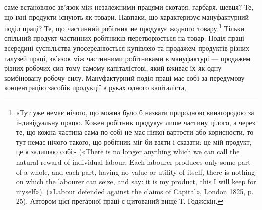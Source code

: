 саме встановлює зв’язок між незалежними працями скотаря,
гарбаря, шевця? Те, що їхні продукти існують як товари. Навпаки,
що характеризує мануфактурний поділ праці? Те, що
частинний робітник не продукує жодного товару.\footnote{
«Тут уже немає нічого, що можна було б назвати природною винагородою
за індивідуальну працю. Кожен робітник продукує лише чаcтину
цілого, а через те, що кожна частина сама по собі не має ніякої
вартости або корисности, то тут немає нічого такого, що робітник міг би
взяти і сказати: це мій продукт, це я залишаю собі» («There is no longer
anything which we can call the natural reward of individual labour.
Each labourer produces only some part of a whole, and each part, having no
value or utility of itself, there is nothing on which the labourer can seize,
and say: it is my product, this I will keep for myself»). («Labour defended
against the claims of Capital», London 1825, p. 25). Автором цієї
прегарної праці є цитований вище Т. Годжскін.
} Тільки спільний
продукт частинних робітників перетворюється на товар. Поділ праці всередині суспільства упосереднюється купівлею та
продажем продуктів різних галузей праці, зв’язок між частинними
робітниками в мануфактурі — продажем різних робочих
сил тому самому капіталістові, який вживає їх як одну комбіновану
робочу силу. Мануфактурний поділ праці має собі за передумову
концентрацію засобів продукції в руках одного капіталіста,
